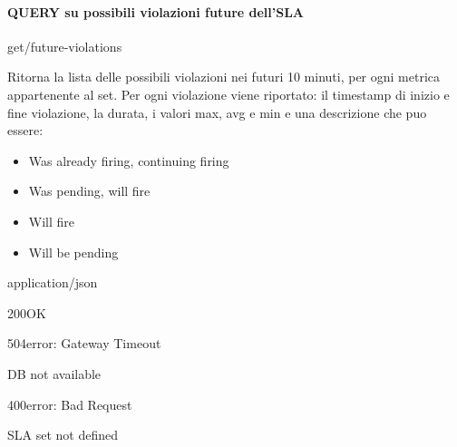 \paragraph{QUERY su possibili violazioni future dell’SLA}
    \begin{apiRoute}{get}{/future-violations}{Ritorna la lista delle possibili violazioni nei futuri 10 minuti, per ogni metrica appartenente al set. Per ogni violazione viene riportato: il timestamp di inizio e fine violazione, la durata, i valori max, avg e min e una descrizione che puo essere: 
    \begin{itemize}[nosep]
        \item Was already firing, continuing firing
        \item Was pending, will fire
        \item Will fire
        \item Will be pending      
    \end{itemize} }
    	\begin{routeResponse}{application/json}
    		\begin{routeResponseItem}{200}{OK}
    			\begin{routeResponseItemBody}
    			\end{routeResponseItemBody}
    		\end{routeResponseItem}
                \begin{routeResponseItem}{504}{error: Gateway Timeout}
    			\begin{routeResponseItemBody}
DB not available
    			\end{routeResponseItemBody}
    		\end{routeResponseItem}
    		\begin{routeResponseItem}{400}{error: Bad Request}
    			\begin{routeResponseItemBody}
SLA set not defined
    			\end{routeResponseItemBody}
    		\end{routeResponseItem}
    	\end{routeResponse}
    	
    \end{apiRoute}
    